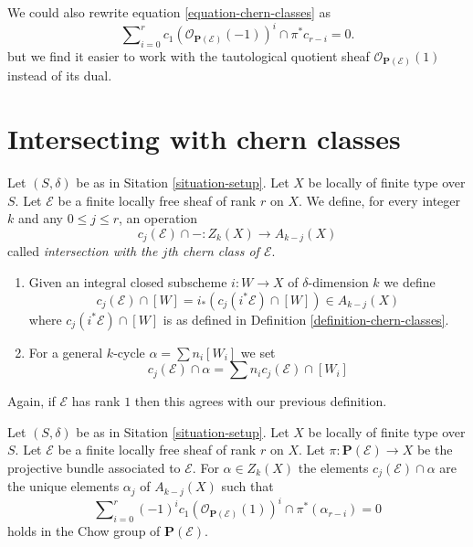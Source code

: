 \begin{remark}
\label{remark-equation-signs}
We could also rewrite equation \ref{equation-chern-classes} as
\begin{equation}
\sum\nolimits_{i = 0}^r
c_1(\mathcal{O}_{\mathbf{P}(\mathcal{E})}(-1))^i \cap \pi^*c_{r - i}
= 0.
\end{equation}
but we find it easier to work with the tautological quotient
sheaf $\mathcal{O}_{\mathbf{P}(\mathcal{E})}(1)$ instead of
its dual.
\end{remark}




\section{Intersecting with chern classes}
\label{section-intersecting-chern-classes}

\noindent


\begin{definition}
\label{definition-cap-chern-classes}
Let $(S, \delta)$ be as in Sitation \ref{situation-setup}.
Let $X$ be locally of finite type over $S$.
Let $\mathcal{E}$ be a finite locally free sheaf of rank $r$ on $X$.
We define, for every integer $k$ and any $0 \leq j \leq r$,
an operation
$$
c_j(\mathcal{E}) \cap - : Z_k(X) \to A_{k - j}(X)
$$
called {\it intersection with the $j$th chern class of $\mathcal{E}$}.
\begin{enumerate}
\item Given an integral closed subscheme $i : W \to X$ of $\delta$-dimension
$k$ we define
$$
c_j(\mathcal{E}) \cap [W] = i_*(c_j({i^*\mathcal{E}}) \cap [W])
\in
A_{k - j}(X)
$$
where $c_j({i^*\mathcal{E}}) \cap [W]$ is as defined in
Definition \ref{definition-chern-classes}.
\item For a general $k$-cycle $\alpha = \sum n_i [W_i]$ we set
$$
c_j(\mathcal{E}) \cap \alpha = \sum n_i c_j(\mathcal{E}) \cap [W_i]
$$
\end{enumerate}
\end{definition}

\noindent
Again, if $\mathcal{E}$ has rank $1$ then this agrees with our
previous definition.

\begin{lemma}
\label{lemma-determine-intersections}
Let $(S, \delta)$ be as in Sitation \ref{situation-setup}.
Let $X$ be locally of finite type over $S$.
Let $\mathcal{E}$ be a finite locally free sheaf of rank $r$ on $X$.
Let $\pi : \mathbf{P}(\mathcal{E}) \to X$ be the projective bundle
associated to $\mathcal{E}$.
For $\alpha \in Z_k(X)$ the elements
$c_j(\mathcal{E}) \cap \alpha$ are the unique elements
$\alpha_j$ of $A_{k - j}(X)$
such that
$$
\sum\nolimits_{i = 0}^r
(-1)^i c_1(\mathcal{O}_{\mathbf{P}(\mathcal{E})}(1))^i \cap
\pi^*(\alpha_{r - i}) = 0
$$
holds in the Chow group of $\mathbf{P}(\mathcal{E})$.
\end{lemma}

